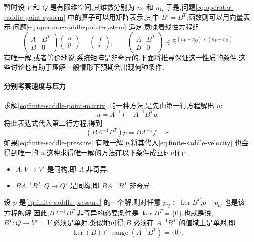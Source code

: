 \begin{note}[有限维情形]\label{note:finite-dimensional-saddle-point}
暂时设 $V$ 和 $Q$ 是有限维空间,其维数分别为 $n_V$ 和 $n_Q$.于是,问题\cref{eq:operator-saddle-point-system} 中的算子可以用矩阵表示,其中 $B'=B^T$;函数则可以用向量表示.问题\cref{eq:operator-saddle-point-system} 适定,意味着线性方程组
\begin{equation}\label{eq:finite-saddle-point-matrix}
  \begin{pmatrix}A&B^T\\B&0\end{pmatrix}
  \begin{pmatrix}u\\p\end{pmatrix}
  =\begin{pmatrix}f\\r\end{pmatrix},
  \qquad
  \begin{pmatrix}A&B^T\\B&0\end{pmatrix}
  \in\mathbb{R}^{(n_V+n_Q)\times(n_V+n_Q)}
\end{equation}
有唯一解,或者等价地说,系统矩阵是非奇异的.下面将推导保证这一性质的条件.这些讨论也有助于理解一般情形下预期会出现何种条件.
\end{note}

\paragraph{分别考察速度与压力}
求解\cref{eq:finite-saddle-point-matrix} 的一种方法,是先由第一行方程解出 $u$:
\begin{equation}\label{eq:finite-saddle-velocity}
  u=A^{-1}f-A^{-1}B^T p.
\end{equation}
将此表达式代入第二行方程,得到
\begin{equation}\label{eq:finite-saddle-pressure}
  (BA^{-1}B^T)p=BA^{-1}f-r.
\end{equation}
如果\cref{eq:finite-saddle-pressure} 有唯一解 $p$,将其代入\cref{eq:finite-saddle-velocity} 也会得到唯一的 $u$.这种求得唯一解的方法在以下条件成立时可行:
\begin{itemize}
  \item $A:V\to V'$ 是同构,即 $A$ 非奇异;
  \item $BA^{-1}B^T:Q\to Q'$ 是同构,即 $BA^{-1}B^T$ 非奇异.
\end{itemize}
设 $p$ 是\cref{eq:finite-saddle-pressure} 的一个解,则对任意 $p_Q\in\ker B^T$,$p+p_Q$ 也是该方程的解.因此,$BA^{-1}B^T$ 非奇异的必要条件是 $\ker B^T=\{0\}$,也就是说,$B^T:Q\to V'=V$ 必须是单射.类似地可得,$B$ 必须在 $A^{-1}B^T$ 的值域上是单射,即
\[
  \ker(B)\cap\operatorname{range}(A^{-1}B^T)=\{0\}.
\]

